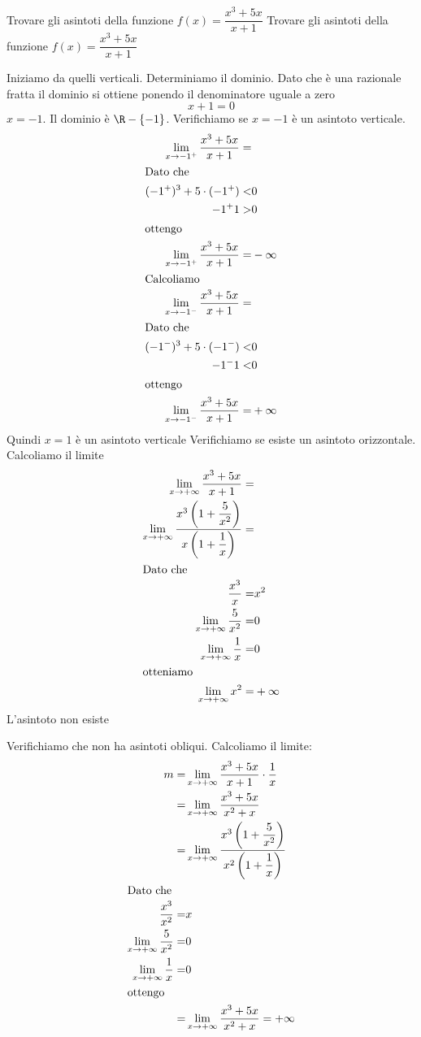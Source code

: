 \begin{exercise}
	Trovare gli asintoti della funzione $f(x)=\dfrac{x^3+5x}{x+1}$
	\tcblower
		Trovare gli asintoti della funzione $f(x)=\dfrac{x^3+5x}{x+1}$
	
	Iniziamo da quelli verticali. Determiniamo il dominio. Dato che è una razionale fratta il dominio si ottiene ponendo il denominatore uguale a zero\[x+1=0\] $x=-1$. Il dominio è $\R-\lbrace-1\rbrace$. Verifichiamo se $x=-1$ è un asintoto verticale.
	\begin{align*}
	\lim_{x\to -1^+}\dfrac{x^3+5x}{x+1}=&\\
	\intertext{Dato che}
	(-1^+)^3+5\cdot(-1^+)<&0\\
	-1^+1>&0\\
	\intertext{ottengo}
	\lim_{x\to -1^+}\dfrac{x^3+5x}{x+1}=&-\infty\\
	\intertext{Calcoliamo}
	\lim_{x\to -1^-}\dfrac{x^3+5x}{x+1}=&\\
	\intertext{Dato che}
	(-1^-)^3+5\cdot(-1^-)<&0\\
-1^-1<&0\\
	\intertext{ottengo}
	\lim_{x\to -1^-}\dfrac{x^3+5x}{x+1}=&+\infty\\
	\end{align*}
	Quindi $x=1$ è un asintoto verticale
	Verifichiamo se esiste un asintoto orizzontale. Calcoliamo il limite
	\begin{align*}
	\lim_{x\to +\infty}\dfrac{x^3+5x}{x+1}=&\\
	\lim_{x\to +\infty}\dfrac{x^3\left(1+\dfrac{5}{x^2}\right)}{x\left(1+\dfrac{1}{x}\right)}=&\\
	\intertext{Dato che}
	\dfrac{x^3}{x}=&x^2\\
	\lim_{x\to +\infty}\dfrac{5}{x^2}=&0\\
	\lim_{x\to +\infty}\dfrac{1}{x}=&0\\
	\intertext{otteniamo}
	\lim_{x\to +\infty}x^2=&+\infty\\
	\end{align*}
	L'asintoto non esiste
	
	Verifichiamo che non ha asintoti obliqui. Calcoliamo il  limite:
	\begin{align*}
	m=&\lim_{x\to +\infty}\dfrac{x^3+5x}{x+1}\cdot\dfrac{1}{x}\\
	=&\lim_{x\to +\infty}\dfrac{x^3+5x}{x^2+x}\\
	=&\lim_{x\to +\infty}\dfrac{x^3\left(1+\dfrac{5}{x^2}\right)}{x^2\left(1+\dfrac{1}{x}\right)}\\
	\intertext{Dato che}
	\dfrac{x^3}{x^2}=&x\\
	\lim_{x\to +\infty}\dfrac{5}{x^2}=&0\\
	\lim_{x\to +\infty}\dfrac{1}{x}=&0\\
	\intertext{ottengo}
	=&\lim_{x\to +\infty}\dfrac{x^3+5x}{x^2+x}=+\infty
	\end{align*}
\end{exercise}
